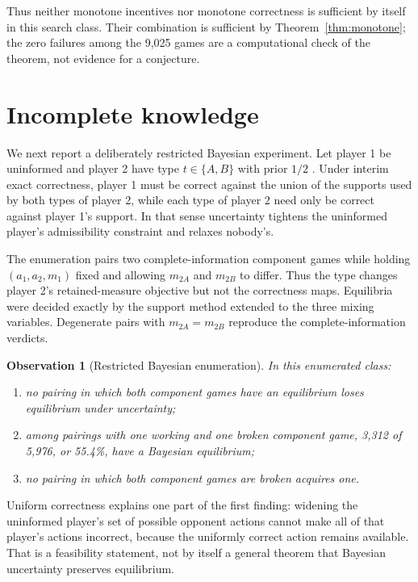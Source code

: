 \documentclass[11pt]{article}
\newtheorem{observation}[theorem]{Observation}
\theoremstyle{definition}
\begin{document}
Thus neither monotone incentives nor monotone correctness is sufficient by itself in this search class. Their combination is sufficient by Theorem~\ref{thm:monotone}; the zero failures among the 9,025 games are a computational check of the theorem, not evidence for a conjecture.

\section{Incomplete knowledge}
We next report a deliberately restricted Bayesian experiment. Let player 1 be uninformed and player 2 have type $t\in\{A,B\}$ with prior $1/2$ \cite{harsanyi}. Under interim exact correctness, player 1 must be correct against the union of the supports used by both types of player 2, while each type of player 2 need only be correct against player 1's support. In that sense uncertainty tightens the uninformed player's admissibility constraint and relaxes nobody's.

The enumeration pairs two complete-information component games while holding $(a_1,a_2,m_1)$ fixed and allowing $m_{2A}$ and $m_{2B}$ to differ. Thus the type changes player 2's retained-measure objective but not the correctness maps. Equilibria were decided exactly by the support method extended to the three mixing variables. Degenerate pairs with $m_{2A}=m_{2B}$ reproduce the complete-information verdicts.

\begin{observation}[Restricted Bayesian enumeration]\label{obs:bayes}
In this enumerated class:
\begin{enumerate}
\item no pairing in which both component games have an equilibrium loses equilibrium under uncertainty;
\item among pairings with one working and one broken component game, 3,312 of 5,976, or 55.4\%, have a Bayesian equilibrium;
\item no pairing in which both component games are broken acquires one.
\end{enumerate}
\end{observation}

Uniform correctness explains one part of the first finding: widening the uninformed player's set of possible opponent actions cannot make all of that player's actions incorrect, because the uniformly correct action remains available. That is a feasibility statement, not by itself a general theorem that Bayesian uncertainty preserves equilibrium.
\end{document}
